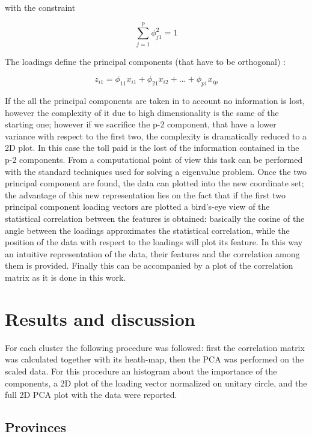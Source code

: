 \documentclass[
12pt, %
a4paper, %
oneside, %
headinclude,footinclude, %
BCOR5mm, %
]{scrartcl}
\begin{document}
with the constraint  \cite{james2013introduction}

\begin{equation}
\sum_{j=1}^{p}\phi_{j1}^{2}=1
\end{equation}

The loadings define the principal components (that have to be orthogonal)  \cite{james2013introduction}: 

\begin{equation}
z_{i1}=\phi_{11}x_{i1}+\phi_{21}x_{i2}+...+\phi_{p1}x_{ip}
\end{equation}

If the all the principal components are taken in to account no information is lost, however the complexity of it due to high dimensionality is the same of the starting one; however if we sacrifice the p-2 component, that have a lower variance with respect to the first two, the complexity is dramatically reduced to a 2D plot. In this case the toll paid is the lost of the information contained in the p-2 components. From a computational point of view this task can be performed with the standard techniques used for solving a eigenvalue problem. Once the two principal component are found, the data can plotted into the new coordinate set; the advantage of this new representation lies on the fact that if the first two principal component loading vectors are plotted a bird's-eye view of the statistical correlation between the features is obtained: basically the cosine of the angle between the loadings approximates the statistical correlation, while the position of the data with respect to the loadings will plot its feature. In this way an intuitive representation of the data, their features and the correlation among them is provided. Finally this can be accompanied by a plot of the correlation matrix as it is done in this work. 

\section{Results and discussion}

For each cluster the following procedure was followed: first the correlation matrix was calculated together with its heath-map, then the PCA was performed on the scaled data. For this procedure an histogram about the importance of the components, a 2D plot of the loading vector normalized on unitary circle, and the full 2D PCA plot with the data were reported. 

\subsection{Provinces} \label{sub_prov}
\end{document}
